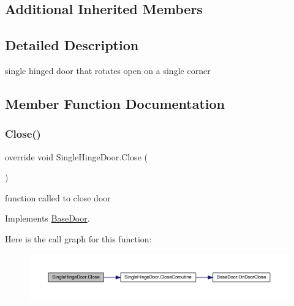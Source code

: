 \subsection*{Additional Inherited Members}


\subsection{Detailed Description}
single hinged door that rotates open on a single corner 



\subsection{Member Function Documentation}
\mbox{\label{class_single_hinge_door_a19848e36fb259f92594916d1af76d3b4}} 
\subsubsection{\texorpdfstring{Close()}{Close()}}
{\footnotesize\ttfamily override void Single\+Hinge\+Door.\+Close (\begin{DoxyParamCaption}{ }\end{DoxyParamCaption})\hspace{0.3cm}{\ttfamily [virtual]}}



function called to close door 



Implements \mbox{\hyperlink{class_base_door_a94151e5cbf90bd3d2b55f339b87916c7}{Base\+Door}}.

Here is the call graph for this function\+:\nopagebreak
\begin{figure}[H]
\begin{center}
\leavevmode
\includegraphics[width=350pt]{class_single_hinge_door_a19848e36fb259f92594916d1af76d3b4_cgraph}
\end{center}
\end{figure}
\mbox{\label{class_single_hinge_door_a6b1760cbc6ac5ed4c0e9d7ecb10d2606}} 
